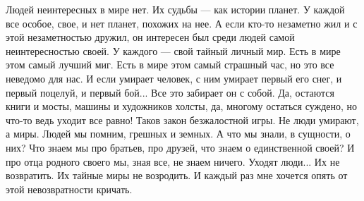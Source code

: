  
 
 
 
 

Людей неинтересных в мире нет.
Их судьбы — как истории планет.
У каждой все особое, свое,
и нет планет, похожих на нее.
А если кто-то незаметно жил
и с этой незаметностью дружил,
он интересен был среди людей
самой неинтересностью своей.
У каждого — свой тайный личный мир.
Есть в мире этом самый лучший миг.
Есть в мире этом самый страшный час,
но это все неведомо для нас.
И если умирает человек,
с ним умирает первый его снег,
и первый поцелуй, и первый бой...
Все это забирает он с собой.
Да, остаются книги и мосты,
машины и художников холсты,
да, многому остаться суждено,
но что-то ведь уходит все равно!
Таков закон безжалостной игры.
Не люди умирают, а миры.
Людей мы помним, грешных и земных.
А что мы знали, в сущности, о них?
Что знаем мы про братьев, про друзей,
что знаем о единственной своей?
И про отца родного своего
мы, зная все, не знаем ничего.
Уходят люди... Их не возвратить.
Их тайные миры не возродить.
И каждый раз мне хочется опять
от этой невозвратности кричать.
